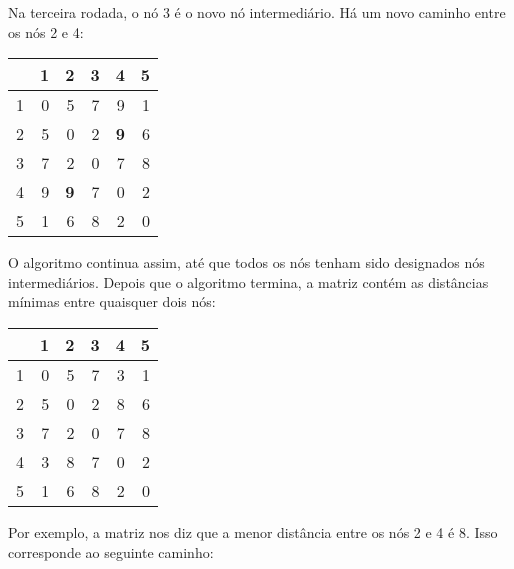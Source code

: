 Na terceira rodada, o nó 3 é o novo nó intermediário.
Há um novo caminho entre os nós 2 e 4:

\begin{center}
\begin{tabular}{r|rrrrr}
 & 1 & 2 & 3 & 4 & 5 \\
\hline
1 & 0 & 5 & 7 & 9 & 1 \\
2 & 5 & 0 & 2 & \textbf{9} & 6 \\
3 & 7 & 2 & 0 & 7 & 8 \\
4 & 9 & \textbf{9} & 7 & 0 & 2 \\
5 & 1 & 6 & 8 & 2 & 0 \\
\end{tabular}
\end{center}
\vspace{10pt}

O algoritmo continua assim,
até que todos os nós tenham sido designados nós intermediários.
Depois que o algoritmo termina, a matriz contém
as distâncias mínimas entre quaisquer dois nós:

\begin{center}
\begin{tabular}{r|rrrrr}
 & 1 & 2 & 3 & 4 & 5 \\
\hline
1 & 0 & 5 & 7 & 3 & 1 \\
2 & 5 & 0 & 2 & 8 & 6 \\
3 & 7 & 2 & 0 & 7 & 8 \\
4 & 3 & 8 & 7 & 0 & 2 \\
5 & 1 & 6 & 8 & 2 & 0 \\
\end{tabular}
\end{center}

Por exemplo, a matriz nos diz que a
menor distância entre os nós 2 e 4 é 8.
Isso corresponde ao seguinte caminho:

\begin{center}
\end{center}

